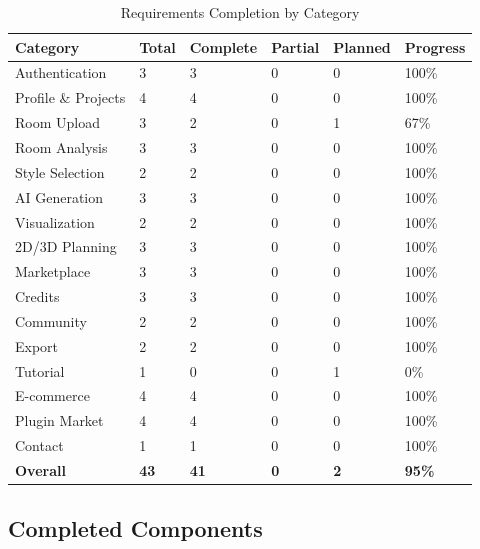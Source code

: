\begin{table}[htbp]
    \centering
    \caption{Requirements Completion by Category}
    \label{tab:req_completion}
    \begin{tabularx}{\textwidth}{|p{3.5cm}|p{1.5cm}|p{1.8cm}|p{1.8cm}|p{1.5cm}|X|}
        \hline
        \textbf{Category} & \textbf{Total} & \textbf{Complete} & \textbf{Partial} & \textbf{Planned} & \textbf{Progress} \\
        \hline
        Authentication & 3 & 3 & 0 & 0 & 100\% \\
        \hline
        Profile \& Projects & 4 & 4 & 0 & 0 & 100\% \\
        \hline
        Room Upload & 3 & 2 & 0 & 1 & 67\% \\
        \hline
        Room Analysis & 3 & 3 & 0 & 0 & 100\% \\
        \hline
        Style Selection & 2 & 2 & 0 & 0 & 100\% \\
        \hline
        AI Generation & 3 & 3 & 0 & 0 & 100\% \\
        \hline
        Visualization & 2 & 2 & 0 & 0 & 100\% \\
        \hline
        2D/3D Planning & 3 & 3 & 0 & 0 & 100\% \\
        \hline
        Marketplace & 3 & 3 & 0 & 0 & 100\% \\
        \hline
        Credits & 3 & 3 & 0 & 0 & 100\% \\
        \hline
        Community & 2 & 2 & 0 & 0 & 100\% \\
        \hline
        Export & 2 & 2 & 0 & 0 & 100\% \\
        \hline
        Tutorial & 1 & 0 & 0 & 1 & 0\% \\
        \hline
        E-commerce & 4 & 4 & 0 & 0 & 100\% \\
        \hline
        Plugin Market & 4 & 4 & 0 & 0 & 100\% \\
        \hline
        Contact & 1 & 1 & 0 & 0 & 100\% \\
        \hline
        \textbf{Overall} & \textbf{43} & \textbf{41} & \textbf{0} & \textbf{2} & \textbf{95\%} \\
        \hline
    \end{tabularx}
\end{table}

\subsection{Completed Components}

